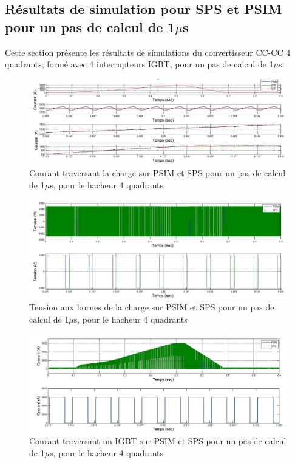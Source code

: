 \subsection{Résultats de simulation pour SPS et PSIM pour un pas de calcul de 1$\mu$s}
Cette section présente les résultats de simulations du convertisseur CC-CC 4 quadrants, formé avec 4 interrupteurs IGBT, pour un pas de calcul de 1$\mu$s. 


\begin{figure}[htb]
\centering
\includegraphics[scale=0.5]{fig/Hacheur4Quadrants/HacheurCourantCharge1u.jpg}
\caption{Courant traversant la charge sur PSIM et SPS pour un pas de calcul de 1$\mu$s, pour le hacheur 4 quadrants}
\label{hc_cou_ch_1}
\end{figure}


\begin{figure}[htb]
\centering
\includegraphics[scale=0.5]{fig/Hacheur4Quadrants/HacheurTensionCharge1u.jpg}
\caption{Tension aux bornes de la charge sur PSIM et SPS pour un pas de calcul de 1$\mu$s, pour le hacheur 4 quadrants}
\label{hc_ten_ch_1}
\end{figure}


\begin{figure}[htb]
\centering
\includegraphics[scale=0.5]{fig/Hacheur4Quadrants/HacheurCourantIGBT1u.jpg}
\caption{Courant traversant un IGBT sur PSIM et SPS pour un pas de calcul de 1$\mu$s, pour le hacheur 4 quadrants}
\label{hc_IG_cou_1}
\end{figure}

